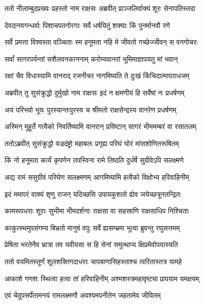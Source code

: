 
\twolineshloka
{ततो नीलाम्बुदप्रख्यः प्रहस्तो नाम राक्षसः}
{अब्रवीत् प्राञ्जलिर्वाक्यं शूरः सेनापतिस्तदा} %

\twolineshloka
{देवदानवगन्धर्वाः पिशाचपतगोरगाः}
{सर्वे धर्षयितुं शक्याः किं पुनर्मानवौ रणे} %

\twolineshloka
{सर्वे प्रमत्ता विश्वस्ता वञ्चिताः स्म हनूमता}
{नहि मे जीवतो गच्छेज्जीवन् स वनगोचरः} %

\twolineshloka
{सर्वां सागरपर्यन्तां सशैलवनकाननाम्}
{करोम्यवानरां भूमिमाज्ञापयतु मां भवान्} %

\twolineshloka
{रक्षां चैव विधास्यामि वानराद् रजनीचर}
{नागमिष्यति ते दुःखं किंचिदात्मापराधजम्} %

\twolineshloka
{अब्रवीत् तु सुसंक्रुद्धो दुर्मुखो नाम राक्षसः}
{इदं न क्षमणीयं हि सर्वेषां नः प्रधर्षणम्} %

\twolineshloka
{अयं परिभवो भूयः पुरस्यान्तःपुरस्य च}
{श्रीमतो राक्षसेन्द्रस्य वानरेण प्रधर्षणम्} %

\twolineshloka
{अस्मिन् मुहूर्ते गत्वैको निवर्तिष्यामि वानरान्}
{प्रविष्टान् सागरं भीममम्बरं वा रसातलम्} %

\twolineshloka
{ततोऽब्रवीत् सुसंक्रुद्धो वज्रदंष्ट्रो महाबलः}
{प्रगृह्य परिघं घोरं मांसशोणितरूषितम्} %

\twolineshloka
{किं नो हनूमता कार्यं कृपणेन तपस्विना}
{रामे तिष्ठति दुर्धर्षे सुग्रीवेऽपि सलक्ष्मणे} %

\twolineshloka
{अद्य रामं ससुग्रीवं परिघेण सलक्ष्मणम्}
{आगमिष्यामि हत्वैको विक्षोभ्य हरिवाहिनीम्} %

\twolineshloka
{इदं ममापरं वाक्यं शृणु राजन् यदिच्छसि}
{उपायकुशलो ह्येव जयेच्छत्रूनतन्द्रितः} %

\twolineshloka
{कामरूपधराः शूराः सुभीमा भीमदर्शनाः}
{राक्षसा वा सहस्राणि राक्षसाधिप निश्चिताः} %

\twolineshloka
{काकुत्स्थमुपसंगम्य बिभ्रतो मानुषं वपुः}
{सर्वे ह्यसम्भ्रमा भूत्वा ब्रुवन्तु रघुसत्तमम्} %

\twolineshloka
{प्रेषिता भरतेनैव भ्रात्रा तव यवीयसा}
{स हि सेनां समुत्थाप्य क्षिप्रमेवोपयास्यति} %

\twolineshloka
{ततो वयमितस्तूर्णं शूलशक्तिगदाधराः}
{चापबाणासिहस्ताश्च त्वरितास्तत्र यामहे} %

\twolineshloka
{आकाशे गणशः स्थित्वा हत्वा तां हरिवाहिनीम्}
{अश्मशस्त्रमहावृष्ट्या प्रापयाम यमक्षयम्} %

\twolineshloka
{एवं चेदुपसर्पेतामनयं रामलक्ष्मणौ}
{अवश्यमपनीतेन जहतामेव जीवितम्} %

